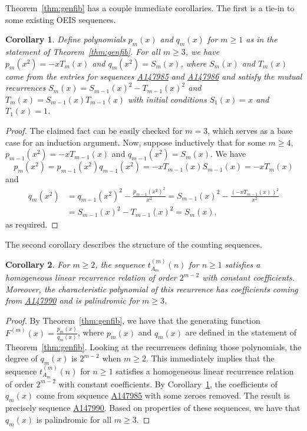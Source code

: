 \documentclass[12pt]{amsart}
\newtheorem{corollary}{Corollary}
\newcommand{\seqnum}[1]{\href{https://oeis.org/#1}{#1}}
\newcommand{\gfnoa}[1]{F^{(#1)}(x)}
\begin{document}
Theorem~\ref{thm:genfib} has a couple immediate corollaries. The first is a tie-in to some existing OEIS sequences.
\begin{corollary}\label{cor:recippolys}
    Define polynomials $p_m(x)$ and $q_m(x)$ for $m\geq1$ as in the statement of Theorem~\ref{thm:genfib}. For all $m\geq3$, we have $p_m(x^2)=-xT_m(x)$ and $q_m(x^2)=S_m(x)$, where $S_m(x)$ and $T_m(x)$ come from the entries for sequences \seqnum{A147985} and \seqnum{A147986} and satisfy the mutual recurrences $S_m(x)=S_{m-1}(x)^2-T_{m-1}(x)^2$ and $T_m(x)=S_{m-1}(x)T_{m-1}(x)$ with initial conditions $S_1(x)=x$ and $T_1(x)=1$.
\end{corollary}
\begin{proof}
    The claimed fact can be easily checked for $m=3$, which serves as a base case for an induction argument. 
    Now, suppose inductively that for some $m\geq4$, $p_{m-1}(x^2)=-xT_{m-1}(x)$ and $q_{m-1}(x^2)=S_m(x)$. 
    We have
    \[
    p_m(x^2)=p_{m-1}(x^2)q_{m-1}(x^2)=-xT_{m-1}(x)S_{m-1}(x)=-xT_m(x)
    \]
    and
    \begin{align*}
    q_m(x^2)&=q_{m-1}(x^2)^2-\frac{p_{m-1}(x^2)^2}{x^2}=S_{m-1}(x)^2-\frac{\left(-xT_{m-1}(x)\right)^2}{x^2}\\
    &=S_{m-1}(x)^2-T_{m-1}(x)^2=S_m(x),
    \end{align*}
    as required.
\end{proof}
The second corollary describes the structure of the counting sequences.
\begin{corollary}
    For $m\geq2$, the sequence $t^{(m)}_{A_m}(n)$ for $n\geq1$ satisfies a homogeneous linear recurrence relation of order $2^{m-2}$ with constant coefficients. Moreover, the characteristic polynomial of this recurrence has coefficients coming from \seqnum{A147990} and is palindromic for $m\geq3$.
\end{corollary}
\begin{proof}
    By Theorem~\ref{thm:genfib}, we have that the generating function $\gfnoa{m}=\frac{p_m(x)}{q_m(x)}$, where $p_m(x)$ and $q_m(x)$ are defined in the statement of Theorem~\ref{thm:genfib}. Looking at the recurrences defining those polynomials, the degree of $q_m(x)$ is $2^{m-2}$ when $m\geq2$. This immediately implies that the sequence $t^{(m)}_{A_m}(n)$ for $n\geq1$ satisfies a homogeneous linear recurrence relation of order $2^{m-2}$ with constant coefficients. By Corollary~\ref{cor:recippolys}, the coefficients of $q_m(x)$ come from sequence \seqnum{A147985} with some zeroes removed. The result is precisely sequence \seqnum{A147990}. Based on properties of these sequences, we have that $q_m(x)$ is palindromic for all $m\geq3$.
\end{proof}
\end{document}
